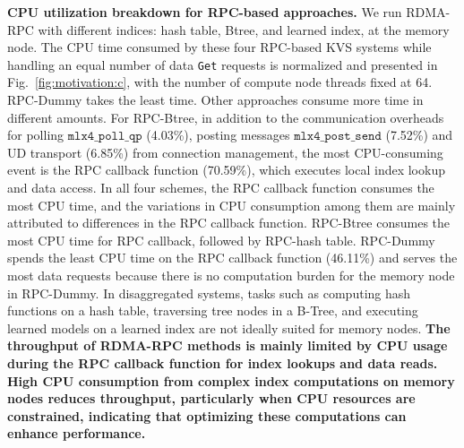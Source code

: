 \textbf{CPU utilization breakdown for RPC-based approaches.}
We run RDMA-RPC with different indices: hash table, Btree, and learned index, at the memory node. 
The CPU time consumed by these four RPC-based KVS systems while handling an equal number of data \texttt{Get} requests is normalized and presented in Fig.~\ref{fig:motivation:c}, with the number of compute node threads fixed at 64. RPC-Dummy takes the least time.
Other approaches consume more time in different amounts.
For RPC-Btree, in addition to the communication overheads for polling $\mathtt{mlx4\_poll\_qp}$ (4.03\%), posting messages $\mathtt{mlx4\_post\_send}$ (7.52\%) and UD transport (6.85\%) from connection management, the most CPU-consuming event is the RPC callback function (70.59\%), which executes local index lookup and data access. 
In all four schemes, the RPC callback function consumes the most CPU time, and the variations in CPU consumption among them are mainly attributed to differences in the RPC callback function. RPC-Btree consumes the most CPU time for RPC callback, followed by RPC-hash table. 
RPC-Dummy spends the least CPU time on the RPC callback function (46.11\%) and serves the most data requests because there is no computation burden for the memory node in RPC-Dummy. 
In disaggregated systems, tasks such as computing hash functions on a hash table, traversing tree nodes in a B-Tree, and executing learned models on a learned index are not ideally suited for memory nodes.
\textbf{The throughput of RDMA-RPC methods is mainly limited by CPU usage during the RPC callback function for index lookups and data reads. High CPU consumption from complex index computations on memory nodes reduces throughput, particularly when CPU resources are constrained, indicating that optimizing these computations can enhance performance.}

